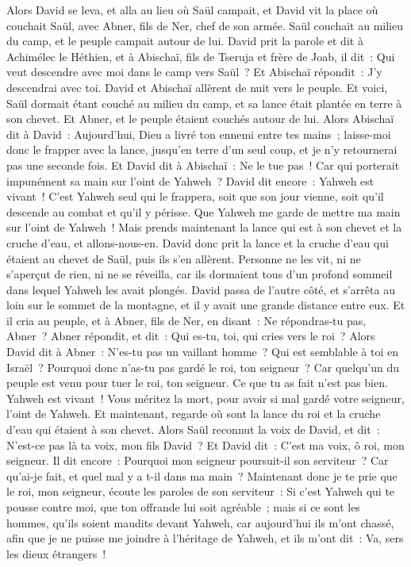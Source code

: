 \begin{multicols}{2}
Alors David se leva, et alla au lieu où Saül campait, et David vit la place où couchait Saül, avec Abner, fils de Ner, chef de son armée. Saül couchait au milieu du camp, et le peuple campait autour de lui.
David prit la parole et dit à Achimélec le Héthien, et à Abischaï, fils de Tseruja et frère de Joab, il dit~: Qui veut descendre avec moi dans le camp vers Saül~? Et Abischaï répondit~: J'y descendrai avec toi.
David et Abischaï allèrent de nuit vers le peuple. Et voici, Saül dormait étant couché au milieu du camp, et sa lance était plantée en terre à son chevet. Et Abner, et le peuple étaient couchés autour de lui.
Alors Abischaï dit à David~: Aujourd'hui, Dieu a livré ton ennemi entre tes mains~; laisse-moi donc le frapper avec la lance, jusqu'en terre d'un seul coup, et je n'y retournerai pas une seconde fois.
Et David dit à Abischaï~: Ne le tue pas~! Car qui porterait impunément sa main sur l'oint de Yahweh~?
David dit encore~: Yahweh est vivant~! C'est Yahweh seul qui le frappera, soit que son jour vienne, soit qu'il descende au combat et qu'il y périsse.
Que Yahweh me garde de mettre ma main sur l'oint de Yahweh~! Mais prends maintenant la lance qui est à son chevet et la cruche d'eau, et allons-nous-en.
David donc prit la lance et la cruche d'eau qui étaient au chevet de Saül, puis ils s'en allèrent. Personne ne les vit, ni ne s'aperçut de rien, ni ne se réveilla, car ils dormaient tous d'un profond sommeil dans lequel Yahweh les avait plongés.
David passa de l'autre côté, et s'arrêta au loin sur le sommet de la montagne, et il y avait une grande distance entre eux.
Et il cria au peuple, et à Abner, fils de Ner, en disant~: Ne répondras-tu pas, Abner~? Abner répondit, et dit~: Qui es-tu, toi, qui cries vers le roi~?
Alors David dit à Abner~: N'es-tu pas un vaillant homme~? Qui est semblable à toi en Israël~? Pourquoi donc n'as-tu pas gardé le roi, ton seigneur~? Car quelqu'un du peuple est venu pour tuer le roi, ton seigneur.
Ce que tu as fait n'est pas bien. Yahweh est vivant~! Vous méritez la mort, pour avoir si mal gardé votre seigneur, l'oint de Yahweh. Et maintenant, regarde où sont la lance du roi et la cruche d'eau qui étaient à son chevet.
Alors Saül reconnut la voix de David, et dit~: N'est-ce pas là ta voix, mon fils David~? Et David dit~: C'est ma voix, ô roi, mon seigneur.
Il dit encore~: Pourquoi mon seigneur poursuit-il son serviteur~? Car qu'ai-je fait, et quel mal y a t-il dans ma main~?
Maintenant donc je te prie que le roi, mon seigneur, écoute les paroles de son serviteur~: Si c'est Yahweh qui te pousse contre moi, que ton offrande lui soit agréable~; mais si ce sont les hommes, qu'ils soient maudits devant Yahweh, car aujourd'hui ils m'ont chassé, afin que je ne puisse me joindre à l'héritage de Yahweh, et ils m'ont dit~: Va, sers les dieux étrangers~!

\end{multicols}
